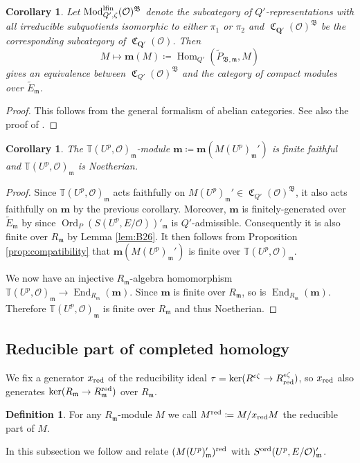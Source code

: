 \documentclass[leqno]{amsart}
\newtheorem{cor}[thm]{Corollary}
\theoremstyle{definition}
\newtheorem{defn}[thm]{Definition}
\theoremstyle{remark}
\newcommand{\oo}{\mathcal{O}}
\newcommand{\Q}{{\mathbf{Q}}}
\DeclareMathOperator{\End}{End}
\DeclareMathOperator{\Hom}{Hom}
\newcommand{\fm}{\mathfrak{m}}
\DeclareMathOperator{\Mod}{\textnormal{Mod}}
\DeclareMathOperator{\fC}{\mathfrak{C}} %
\DeclareMathOperator{\Ord}{Ord} %
\newcommand{\B}{\mathfrak B} %
\newcommand{\lfin}{\textnormal{lfin}}
\newcommand{\red}{\textnormal{red}}
\newcommand{\xx}{x_\textnormal{red}}
\newcommand{\TT}{\mathbb{T}} %
\newcommand{\ord}{\textnormal{ord}} %
\begin{document}
\begin{cor}
Let $\Mod^{\lfin}_{Q',\zeta}(\oo)^{\B}$
denote the subcategory of $Q'$-representations
with all irreducible subquotients isomorphic 
to either $\pi_1$ or $\pi_2$
and $\fC_{\Q'}(\oo)^\B$ be the corresponding 
subcategory of $\fC_{\Q'}(\oo)$. Then
\begin{equation}\label{eq:anti_equiv}
        M  \mapsto 
        \mathbf{m}(M)\coloneqq 
        \Hom_{Q'}(\tilde{P}_{\B,\fm}, M)
\end{equation}
gives an equivalence between $\fC_{Q'}(\oo)^\B$
and the category of compact modules over 
$\tilde{E}_{\fm}$.
\end{cor}
\begin{proof}
This follows from the general formalism of abelian categories.
See also the proof of \cite[Prop.5.45]{pask}.
\end{proof}


\begin{cor}\label{cor:Hecke_Noetherian}
    The $\TT(U^p,\oo)_{\fm}$-module
	$\mathbf{m}\coloneqq \mathbf{m}(M(U^p)_{\fm}')$
	is finite faithful and $\TT(U^p,\oo)_{\fm}$
    is Noetherian.
\end{cor}
\begin{proof}
    Since $\TT(U^p,\oo)_\fm$ acts faithfully on 
    $M(U^p)_\fm'\in \fC_{Q'}(\oo)^\B$,
    it also acts faithfully on 
	$\mathbf{m}$
    by the previous corollary.
    Moreover, $\mathbf{m}$
    is finitely-generated  over $\tilde{E}_{\fm}$ 
    by \cite[Prop 4.17]{pask} since 
    $\Ord_P(S(U^p,E/\oo))'_{\fm}$ is $Q'$-admissible.
    Consequently it is also finite over  $R_{\fm}$
    by Lemma \ref{lem:B26}.
    It then follows from Proposition
    \ref{prop:compatibility}
    that  $\mathbf{m}(M(U^p)_{\fm}')$ is finite over 
    $\TT(U^p,\oo)_\fm$.

    We now have an injective $R_\fm$-algebra homomorphism 
	$\TT(U^p,\oo)_{\fm}\to\End_{R_{\fm}}(\mathbf{m})$.
    Since $\mathbf{m}$ is finite over $R_\fm$,
    so is $\End_{R_\fm}(\mathbf{m})$.
    Therefore $\TT(U^p,\oo)_\fm$
	is finite over $R_{\fm}$ and thus Noetherian.
\end{proof}


\subsection{Reducible part of completed homology}

We fix a generator $\xx$ of the reducibility ideal
$\tau=\ker(R^{\epsilon\zeta}\to R^{\epsilon\zeta}_{\red})$,
so $\xx$ also generates $\ker(R_\fm\to R_\fm^{\red})$ over $R_\fm$.
\begin{defn}
For any $R_{\fm}$-module $M$
we call $M^{\red}\coloneqq M/\xx M$
the reducible part of $M$.
\end{defn}
In this subsection we follow \cite{urban}
and relate $(M(U^p)_\fm')^{\red}$
with $S^{\ord}(U^p,E/\oo)_\fm'$.
\end{document}
